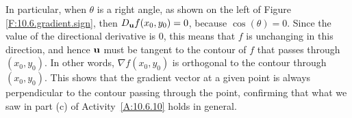 
In particular, when $\theta$ is a right angle, as shown on the left of
Figure \ref{F:10.6.gradient.sign}, then $D_{\mathbf{u}}f(x_0,y_0) = 0$, because $\cos(\theta) = 0$.  Since the value of the directional derivative is 0, this means that $f$ is unchanging in this direction, and hence $\mathbf{u}$ must be tangent to the contour of $f$ that passes through $(x_0,y_0)$.  In other words, $\nabla f(x_0,y_0)$ is orthogonal to the
contour through $(x_0,y_0)$.  This shows that the gradient vector at a given point is always perpendicular to the contour passing through the point, confirming that what we saw in part (c) of Activity~\ref{A:10.6.10} holds in general.

